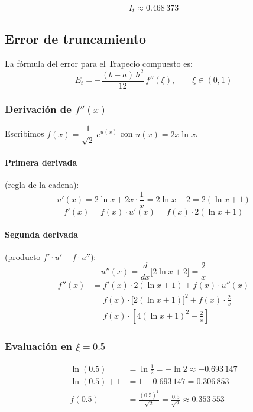 \documentclass[12pt,a4paper]{article}
\begin{document}
\[
  \boxed{I_t \approx 0.468\,373}
\]

\subsection*{Error de truncamiento}

La f\'ormula del error para el Trapecio compuesto es:
\[
  E_t = -\frac{(b-a)\,h^2}{12}\,f''(\xi), \qquad \xi \in (0,1)
\]

\subsubsection*{Derivaci\'on de $f''(x)$}

Escribimos $f(x) = \dfrac{1}{\sqrt{2}}\,e^{u(x)}$ con $u(x) = 2x\ln x$.

\paragraph{Primera derivada} (regla de la cadena):
\[
  u'(x) = 2\ln x + 2x\cdot\frac{1}{x} = 2\ln x + 2 = 2(\ln x + 1)
\]
\[
  f'(x) = f(x)\cdot u'(x) = f(x)\cdot 2(\ln x + 1)
\]

\paragraph{Segunda derivada} (producto $f'\cdot u' + f\cdot u''$):
\[
  u''(x) = \frac{d}{dx}\bigl[2\ln x + 2\bigr] = \frac{2}{x}
\]
\begin{align*}
  f''(x) &= f'(x)\cdot 2(\ln x+1) + f(x)\cdot u''(x) \\
          &= f(x)\cdot\bigl[2(\ln x+1)\bigr]^2 + f(x)\cdot\frac{2}{x} \\[4pt]
          &= f(x)\cdot\left[4(\ln x+1)^2 + \frac{2}{x}\right]
\end{align*}

\subsubsection*{Evaluaci\'on en $\xi = 0.5$}

\begin{align*}
  \ln(0.5) &= \ln\!\tfrac{1}{2} = -\ln 2 \approx -0.693\,147 \\
  \ln(0.5)+1 &= 1 - 0.693\,147 = 0.306\,853 \\
  f(0.5) &= \frac{(0.5)^1}{\sqrt{2}} = \frac{0.5}{\sqrt{2}} \approx 0.353\,553
\end{align*}
\end{document}
